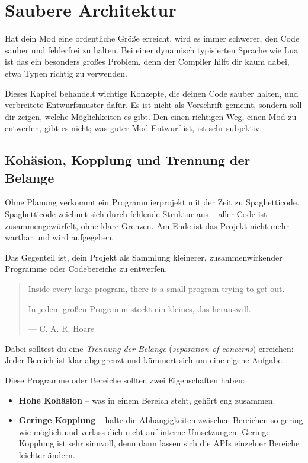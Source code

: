 \chapter{Saubere Architektur}
\label{ch:quality/clean-arch}

Hat dein Mod eine ordentliche Größe erreicht, wird es immer schwerer,
den Code sauber und fehlerfrei zu halten. Bei einer dynamisch
typisierten Sprache wie Lua ist das ein besonders großes Problem, denn
der Compiler hilft dir kaum dabei, etwa Typen richtig zu verwenden.

Dieses Kapitel behandelt wichtige Konzepte, die deinen Code sauber
halten, und verbreitete Entwurfsmuster dafür. Es ist nicht als
Vorschrift gemeint, sondern soll dir zeigen, welche Möglichkeiten es
gibt. Den einen richtigen Weg, einen Mod zu entwerfen, gibt es nicht;
was guter Mod-Entwurf ist, ist sehr subjektiv.

\section{Kohäsion, Kopplung und Trennung der
Belange}\label{kohuxe4sion-kopplung-und-trennung-der-belange}

Ohne Planung verkommt ein Programmierprojekt mit der Zeit zu
Spaghetticode. Spaghetticode zeichnet sich durch fehlende Struktur aus
-- aller Code ist zusammengewürfelt, ohne klare Grenzen. Am Ende ist das
Projekt nicht mehr wartbar und wird aufgegeben.

Das Gegenteil ist, dein Projekt als Sammlung kleinerer,
zusammenwirkender Programme oder Codebereiche zu entwerfen.

\begin{quote}
Inside every large program, there is a small program trying to get out.

In jedem großen Programm steckt ein kleines, das herauswill.

--- C. A. R. Hoare
\end{quote}

Dabei solltest du eine \emph{Trennung der Belange} (\emph{separation of
concerns}) erreichen: Jeder Bereich ist klar abgegrenzt und kümmert sich
um eine eigene Aufgabe.

Diese Programme oder Bereiche sollten zwei Eigenschaften haben:

\begin{itemize}
\tightlist
\item
  \textbf{Hohe Kohäsion} -- was in einem Bereich steht, gehört eng
  zusammen.
\item
  \textbf{Geringe Kopplung} -- halte die Abhängigkeiten zwischen
  Bereichen so gering wie möglich und verlass dich nicht auf interne
  Umsetzungen. Geringe Kopplung ist sehr sinnvoll, denn dann lassen sich
  die APIs einzelner Bereiche leichter ändern.
\end{itemize}


